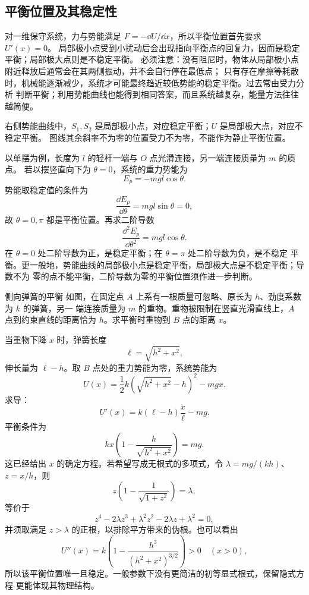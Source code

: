 {\subsection{平衡位置及其稳定性}

对一维保守系统，力与势能满足 $F=-\dd U/\dd x$，所以平衡位置首先要求 $U'(x)=0$。
局部极小点受到小扰动后会出现指向平衡点的回复力，因而是稳定平衡；局部极大点则是不稳定平衡。
必须注意：没有阻尼时，物体从局部极小点附近释放后通常会在其两侧振动，并不会自行停在最低点；
只有存在摩擦等耗散时，机械能逐渐减少，系统才可能最终趋近较低势能的稳定平衡。过去常由受力分析
判断平衡；利用势能曲线也能得到相同答案，而且系统越复杂，能量方法往往越简便。

\potentialDiagram

右侧势能曲线中，$S_1,S_2$ 是局部极小点，对应稳定平衡；$U$ 是局部极大点，对应不稳定平衡。
图线其余斜率不为零的位置受力不为零，不能作为静止平衡位置。

以单摆为例，长度为 $l$ 的轻杆一端与 $O$ 点光滑连接，另一端连接质量为 $m$ 的质点。
若以摆竖直向下为 $\theta=0$，系统的重力势能为
\begin{equation}
 E_p=-mgl\cos\theta.
\end{equation}
势能取稳定值的条件为
\begin{equation}
 \frac{\dd E_p}{\dd\theta}=mgl\sin\theta=0,
\end{equation}
故 $\theta=0,\pi$ 都是平衡位置。再求二阶导数
\begin{equation}
 \frac{\dd^2E_p}{\dd\theta^2}=mgl\cos\theta.
\end{equation}
在 $\theta=0$ 处二阶导数为正，是稳定平衡；在 $\theta=\pi$ 处二阶导数为负，是不稳定
平衡。更一般地，势能曲线的局部极小点是稳定平衡，局部极大点是不稳定平衡；导数不为
零的点不能平衡，二阶导数为零的平衡位置须作进一步判断。

\begin{origexamplebox}{侧向弹簧的平衡}\label{ch01:ex:s14-1-10}
如图，在固定点 $A$ 上系有一根质量可忽略、原长为 $h$、劲度系数为 $k$ 的弹簧，另一
端连接质量为 $m$ 的重物。重物被限制在竖直光滑直线上，$A$ 点到约束直线的距离恰为
$h$。求平衡时重物到 $B$ 点的距离 $x$。
\end{origexamplebox}

\begin{xesolution}
当重物下降 $x$ 时，弹簧长度
\[
 \ell=\sqrt{h^2+x^2},
\]
伸长量为 $\ell-h$。取 $B$ 点处的重力势能为零，系统势能为
\[
 U(x)=\frac12k(\sqrt{h^2+x^2}-h)^2-mgx.
\]
求导：
\[
 U'(x)=k(\ell-h)\frac{x}{\ell}-mg.
\]
平衡条件为
\[
 \boxed{kx\left(1-\frac{h}{\sqrt{h^2+x^2}}\right)=mg}.
\]
这已经给出 $x$ 的确定方程。若希望写成无根式的多项式，令
$\lambda=mg/(kh)$、$z=x/h$，则
\[
 z\left(1-\frac1{\sqrt{1+z^2}}\right)=\lambda,
\]
等价于
\[
 \boxed{z^4-2\lambda z^3+\lambda^2z^2-2\lambda z+\lambda^2=0},
\]
并须取满足 $z>\lambda$ 的正根，以排除平方带来的伪根。也可以看出
\[
 U''(x)=k\left(1-\frac{h^3}{(h^2+x^2)^{3/2}}\right)>0\quad(x>0),
\]
所以该平衡位置唯一且稳定。一般参数下没有更简洁的初等显式根式，保留隐式方程
更能体现其物理结构。


\end{xesolution}}

